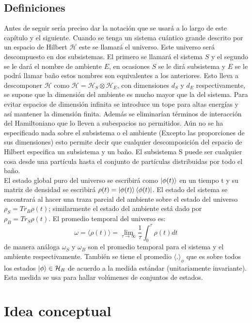 \subsection{Definiciones}

Antes de seguir sería preciso dar la notación que se usará a lo largo de este capítulo y el siguiente. Cuando se tenga un sistema cuántico grande descrito por un espacio de Hilbert $\mathcal{H}$  este se llamará el universo. Este universo será descompuesto en  dos subsistemas. El primero se llamará el sistema $S$  y el segundo se le dará el nombre de ambiente $E$, en ocasiones $S$ se le dirá subsistema y $E$ se le podrá llamar baño estos nombres son equivalentes a los anteriores. Esto lleva a descomponer $\mathcal{H}$ como $\mathcal{H}=\mathcal{H}_{S} \otimes \mathcal{H}_{E}$, con dimensiones $d_{S}$ y $d_{E}$ respectivamente, se supone que la dimensión del ambiente es mucho mayor que la del sistema. Para evitar espacios de dimensión infinita se introduce un tope para altas energías y así mantener la dimensión finita. Además se eliminarían términos de interacción del Hamiltoniano que lo lleven a subespacios no permitidos. Aún no se ha especificado nada sobre el subsistema o el ambiente (Excepto las proporciones de sus dimensiones)  esto permite decir que cualquier descomposición del espacio de Hilbert especifica un subsistema y un baño. El subsistema S puede ser cualquier cosa desde una partícula hasta el conjunto de partículas distribuidas por todo el baño.
\\
El estado global puro del universo se escribirá como $\ket{\phi(t)}$ en un tiempo t y su matriz de densidad se escribirá $\rho(t)=\ket{\phi(t)}\bra{\phi(t)}$. El estado del sistema se encontrará al hacer una traza parcial del ambiente sobre el estado del universo $\rho_{S}=Tr_{B} \rho(t)$; similarmente el estado del ambiente está dado por $\rho_{B}=Tr_{S} \rho(t)$. El promedio temporal del universo es:
\begin{equation}
\omega= \langle \rho(t) \rangle= \lim_{\tau \to \infty} \frac{1}{\tau} \int_{0}^{\tau} \rho (t)dt
\end{equation}
de manera análoga $\omega_{S}$ y $\omega_{B}$ son el promedio temporal para el sistema y el ambiente respectivamente. También se tiene el promedio $\langle . \rangle_{\phi}$ que es sobre todos los estados $\ket{\phi} \in \mathcal{H}_{R}$ de acuerdo a la medida estándar (unitariamente invariante). Esta medida se usa para hallar volúmenes de conjuntos de estados.

\section{Idea conceptual}


